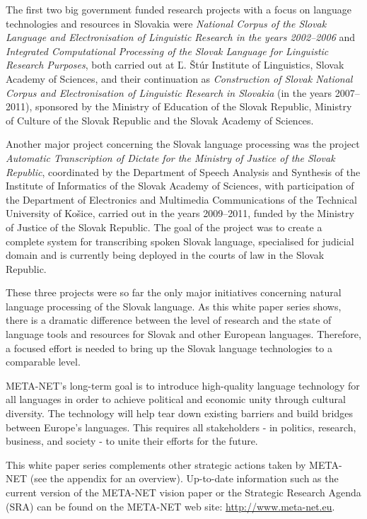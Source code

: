 \begin{multicols}{2}
The first two big government funded research projects with a focus on language
technologies and resources in Slovakia were \emph{National Corpus of the Slovak
Language and Electronisation of Linguistic Research in the years 2002--2006}
and \emph{Integrated Computational Processing of the Slovak Language for
Linguistic Research Purposes}, both carried out at Ľ. Štúr Institute of
Linguistics, Slovak Academy of Sciences, and their continuation as
\emph{Construction of Slovak National Corpus and Electronisation of Linguistic
Research in Slovakia} (in the years 2007--2011), sponsored by the Ministry of
Education of the Slovak Republic, Ministry of Culture of the Slovak Republic
and the Slovak Academy of Sciences.

Another major project concerning the Slovak language processing was the project
\emph{Automatic Transcription of Dictate for the Ministry of Justice of the
Slovak Republic},  coordinated by the Department of Speech Analysis and
Synthesis of the Institute of Informatics of the Slovak Academy of Sciences,
with participation of the Department of Electronics and Multimedia
Communications of the Technical University of Košice, carried out in the years
2009--2011, funded by the Ministry of Justice of the Slovak Republic.  The goal
of the project was to create a complete system for transcribing spoken Slovak
language, specialised for judicial domain and is currently being deployed in
the courts of law in the Slovak Republic.


These three projects were so far the only major initiatives concerning natural   
language processing of the Slovak language. As this white paper series
shows, there is a dramatic difference between the level of research and the 
state of language tools and resources for Slovak and other European languages. 
Therefore, a focused effort is needed to bring up the Slovak language technologies to a comparable level.




META-NET’s long-term goal is to introduce high-quality language technology for all languages in order to achieve political and economic unity through cultural diversity. The technology will help tear down existing barriers and build bridges between Europe’s languages. This requires all stakeholders - in politics, research, business, and society - to unite their efforts for the future.

This white paper series complements other strategic actions taken by META-NET (see the appendix for an overview). Up-to-date information such as the current version of the META-NET vision paper\cite{Meta1} or the Strategic Research Agenda (SRA) can be found on the META-NET web site: \url{http://www.meta-net.eu}.



\end{multicols}

